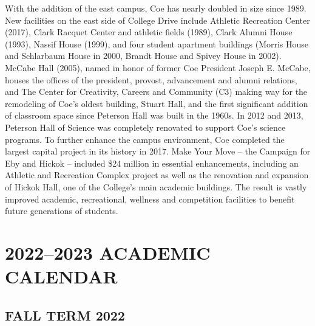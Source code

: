 \documentclass[
  letterpaper,
]{scrbook}
\renewcommand{\part}[1]{\addcontentsline{toc}{part}{#1}}
\begin{document}
With the addition of the east campus, Coe has nearly doubled in size
since 1989. New facilities on the east side of College Drive include
Athletic Recreation Center (2017), Clark Racquet Center and athletic
fields (1989), Clark Alumni House (1993), Nassif House (1999), and four
student apartment buildings (Morris House and Schlarbaum House in 2000,
Brandt House and Spivey House in 2002). McCabe Hall (2005), named in
honor of former Coe President Joseph E. McCabe, houses the offices of
the president, provost, advancement and alumni relations, and The Center
for Creativity, Careers and Community (C3) making way for the remodeling
of Coe's oldest building, Stuart Hall, and the first significant
addition of classroom space since Peterson Hall was built in the 1960s.
In 2012 and 2013, Peterson Hall of Science was completely renovated to
support Coe's science programs. To further enhance the campus
environment, Coe completed the largest capital project in its history in
2017. Make Your Move -- the Campaign for Eby and Hickok -- included \$24
million in essential enhancements, including an Athletic and Recreation
Complex project as well as the renovation and expansion of Hickok Hall,
one of the College's main academic buildings. The result is vastly
improved academic, recreational, wellness and competition facilities to
benefit future generations of students.

\part{ACADEMIC RESOURCES}

\chapter{2022--2023 ACADEMIC CALENDAR}\label{sec-academic-calendar}

\section{FALL TERM 2022}\label{fall-term-2022}
\end{document}
